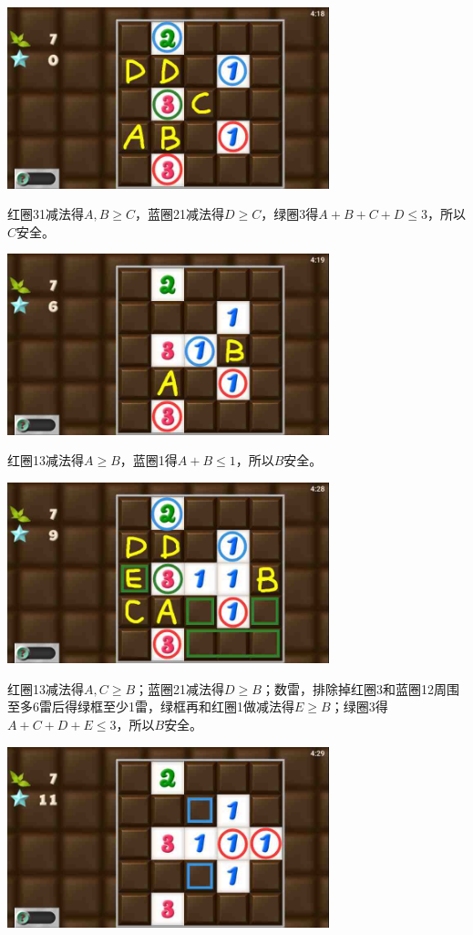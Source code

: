 \subsection{} %
\begin{center}
    \includegraphics[width=0.7\textwidth]{puzzlelow/209-1.jpg}
\end{center}
红圈31减法得$A,B\ge C$，蓝圈21减法得$D\ge C$，绿圈3得$A+B+C+D\le 3$，所以$C$安全。
\begin{center}
    \includegraphics[width=0.7\textwidth]{puzzlelow/209-2.jpg}
\end{center}
红圈13减法得$A\ge B$，蓝圈1得$A+B\le 1$，所以$B$安全。
\begin{center}
    \includegraphics[width=0.7\textwidth]{puzzlelow/209-3.jpg}
\end{center}
红圈13减法得$A,C\ge B$；蓝圈21减法得$D\ge B$；数雷，排除掉红圈3和蓝圈12周围至多6雷后得绿框至少1雷，绿框再和红圈1做减法得$E\ge B$；绿圈3得$A+C+D+E\le 3$，所以$B$安全。
\begin{center}
    \includegraphics[width=0.7\textwidth]{puzzlelow/209-4.jpg}
\end{center}
